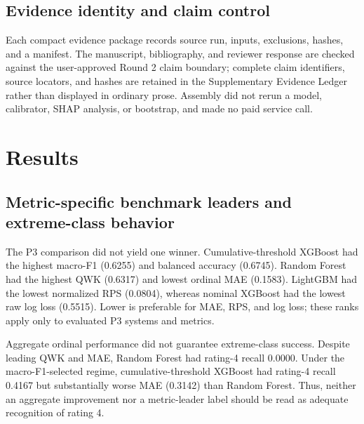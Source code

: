 \documentclass[information,article,submit,pdftex,moreauthors]{Definitions/mdpi}
\begin{document}
\subsection{Evidence identity and claim control}

Each compact evidence package records source run, inputs, exclusions, hashes, and a manifest. The manuscript, bibliography, and reviewer response are checked against the user-approved Round 2 claim boundary; complete claim identifiers, source locators, and hashes are retained in the Supplementary Evidence Ledger rather than displayed in ordinary prose. Assembly did not rerun a model, calibrator, SHAP analysis, or bootstrap, and made no paid service call.

\section{Results}

\subsection{Metric-specific benchmark leaders and extreme-class behavior}

The P3 comparison did not yield one winner. Cumulative-threshold XGBoost had the highest macro-F1 (0.6255) and balanced accuracy (0.6745). Random Forest had the highest QWK (0.6317) and lowest ordinal MAE (0.1583). LightGBM had the lowest normalized RPS (0.0804), whereas nominal XGBoost had the lowest raw log loss (0.5515). Lower is preferable for MAE, RPS, and log loss; these ranks apply only to evaluated P3 systems and metrics.

Aggregate ordinal performance did not guarantee extreme-class success. Despite leading QWK and MAE, Random Forest had rating-4 recall 0.0000. Under the macro-F1-selected regime, cumulative-threshold XGBoost had rating-4 recall 0.4167 but substantially worse MAE (0.3142) than Random Forest. Thus, neither an aggregate improvement nor a metric-leader label should be read as adequate recognition of rating 4.
\end{document}
